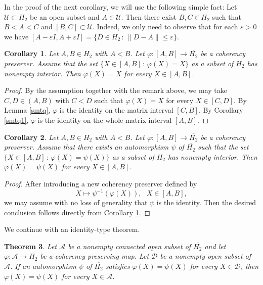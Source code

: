 \documentclass[10pt,a4paper]{amsart}
\providecommand{\index}[1]{}
\newcommand\oH{{\overline{H_2}}}
\newtheorem{theorem}{Theorem}[section]
\newtheorem{corollary}[theorem]{Corollary}
\theoremstyle{definition}
\theoremstyle{remark}
\numberwithin{subsection}{section}
\numberwithin{equation}{section}
\begin{document}
In the proof of the next corollary, we will use the following simple fact: Let $\mathcal{U} \subset H_2$ be an open subset and $A \in \mathcal{U}$. Then there exist $B,C \in H_2$ such that $B < A < C$ and $[B,C] \subset \mathcal{U}$. Indeed, we only need to observe that for each $\varepsilon > 0$ we have $[ A- \varepsilon I, A + \varepsilon I ] = \{ D \in H_2 \, : \, \| D-A \| \le \varepsilon \}$.

\begin{corollary}\label{smtq2}
Let $A,B\in H_2$ with $A < B$. Let $\varphi \colon [A,B] \to \oH$ 
be a coherency preserver. Assume that 
the set $\{X\in [A, B]\,:\, \varphi (X) = X\}$ as a subset of $H_2$ has nonempty interior.
Then $\varphi (X) = X$ for every $X \in [A,B]$.
\end{corollary}

\begin{proof}
By the assumption together with the remark above, we may take $C, D\in (A, B)$ with $C<D$ such that $\varphi(X)=X$ for every $X\in [C, D]$. 
By Lemma \ref{smtq}, $\varphi$ is the identity on the matrix interval $[C, B]$. By Corollary \ref{smtq1}, $\varphi$ is the identity on the whole matrix interval $[A,B]$.
\end{proof}

\begin{corollary}\label{kiakia}
Let $A,B\in H_2$ with $A < B$. Let $\varphi \colon [A,B] \to \oH$ 
be a coherency preserver. 
Assume that there exists an automorphism $\psi$ of $\oH$
such that the set $\{X\in [A, B]\,:\, \varphi (X) = \psi (X) \}$ as a subset of $H_2$ has nonempty interior.
Then $\varphi (X) = \psi (X)$ for every $X \in [A,B]$.
\end{corollary}

\begin{proof}
After introducing a new coherency preserver defined by
\[
X \mapsto \psi^{-1} (\varphi (X)), \ \ \ X \in [A,B],
\]
we may assume with no loss of generality that $\psi$ is the identity. Then the desired conclusion follows directly from Corollary \ref{smtq2}.
\end{proof}



We continue with an identity-type theorem\index{identity-type theorem}. 

\begin{theorem}\label{identity}
Let $\mathcal{A}$ be a nonempty connected open subset of $\oH$ and let $\varphi \colon \mathcal{A} \to \oH$ be a coherency preserving map. Let $\mathcal{D}$ be a nonempty open subset of $\mathcal{A}$. If an automorphism $\psi$ of $\oH$
satisfies $\varphi (X) = \psi (X)$ for every $X \in \mathcal{D}$, then $\varphi (X) = \psi (X)$ for every $X \in \mathcal{A}$.
\end{theorem}
\end{document}
